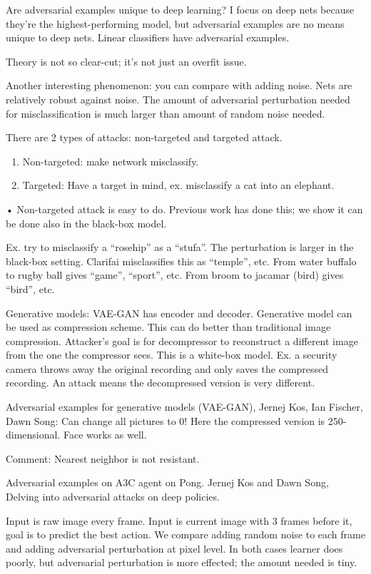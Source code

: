 Are adversarial examples unique to deep learning? I focus on deep nets because they're the highest-performing model, but adversarial examples are no means unique to deep nets. Linear classifiers have adversarial examples.

Theory is not so clear-cut; it's not just an overfit issue.

Another interesting phenomenon: you can compare with adding noise. Nets are relatively robust against noise. The amount of adversarial perturbation needed for misclassification is much larger than amount of random noise needed.

There are 2 types of attacks: non-targeted and targeted attack.
\begin{enumerate}
\item
Non-targeted: make network misclassify.
\item
Targeted: Have a target in mind, ex. misclassify a cat into an elephant.
\end{enumerate}•
Non-targeted attack is easy to do. Previous work has done this; we show it can be done also in the black-box model.

Ex. try to misclassify a ``rosehip'' as a ``stufa''. The perturbation is larger in the black-box setting. Clarifai misclassifies this as ``temple'', etc. From water buffalo to rugby ball gives ``game'', ``sport'', etc. From broom to jacamar (bird) gives ``bird'', etc.

Generative models: VAE-GAN has encoder and decoder. Generative model can be used as compression scheme. This can do better than traditional image compression. Attacker's goal is for decompressor to reconstruct a different image from the one the compressor sees.
This is a white-box model. Ex. a security camera throws away the original recording and only saves the compressed recording. An attack means the decompressed version is very different.

Adversarial examples for generative models (VAE-GAN), Jernej Kos, Ian Fischer, Dawn Song: Can change all pictures to 0! Here the compressed version is 250-dimensional. Face works as well.

Comment: Nearest neighbor is not resistant.

Adversarial examples on A3C agent on Pong. Jernej Kos and Dawn Song, Delving into adversarial attacks on deep policies. 

Input is raw image every frame. Input is current image with 3 frames before it, goal is to predict the best action. We compare adding random noise to each frame and adding adversarial perturbation at pixel level. In both cases learner does poorly, but adversarial perturbation is more effected; the amount needed is tiny. 

